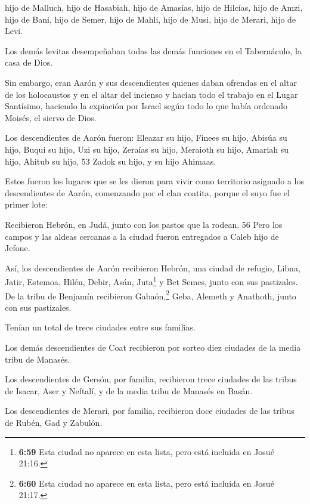 hijo de Malluch,  hijo de Hasabiah, hijo de Amasías, hijo
de Hilcías,  hijo de Amzi, hijo de Bani, hijo de Semer,
 hijo de Mahli, hijo de Musi, hijo de Merari, hijo de Levi.

 Los demás levitas desempeñaban todas las demás funciones
en el Tabernáculo, la casa de Dios.

 Sin embargo, eran Aarón y sus descendientes quienes daban
ofrendas en el altar de los holocaustos y en el altar del incienso y
hacían todo el trabajo en el Lugar Santísimo, haciendo la expiación por
Israel según todo lo que había ordenado Moisés, el siervo de Dios.

 Los descendientes de Aarón fueron: Eleazar su hijo, Finees
su hijo, Abisúa su hijo,  Buqui su hijo, Uzi su hijo,
Zeraías su hijo,  Meraioth su hijo, Amariah su hijo, Ahitub
su hijo, 53 Zadok su hijo, y su hijo Ahimaas.

 Estos fueron los lugares que se les dieron para vivir como
territorio asignado a los descendientes de Aarón, comenzando por el clan
coatita, porque el suyo fue el primer lote:

 Recibieron Hebrón, en Judá, junto con los pastos que la
rodean. 56 Pero los campos y las aldeas cercanas a la ciudad fueron
entregados a Caleb hijo de Jefone.

 Así, los descendientes de Aarón recibieron Hebrón, una
ciudad de refugio, Libna, Jatir, Estemoa,  Hilén, Debir,
 Asán, Juta\footnote{\textbf{6:59} Esta ciudad no aparece
  en esta lista, pero está incluida en Josué 21:16.} y Bet Semes, junto
con sus pastizales.  De la tribu de Benjamín recibieron
Gabaón,\footnote{\textbf{6:60} Esta ciudad no aparece en esta lista,
  pero está incluida en Josué 21:17.} Geba, Alemeth y Anathoth, junto
con sus pastizales.

Tenían un total de trece ciudades entre sus familias.

 Los demás descendientes de Coat recibieron por sorteo diez
ciudades de la media tribu de Manasés.

 Los descendientes de Gersón, por familia, recibieron trece
ciudades de las tribus de Isacar, Aser y Neftalí, y de la media tribu de
Manasés en Basán.

 Los descendientes de Merari, por familia, recibieron doce
ciudades de las tribus de Rubén, Gad y Zabulón.

